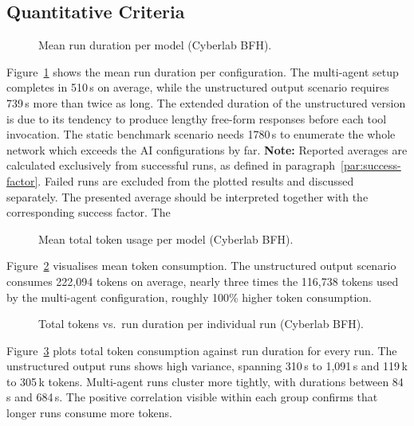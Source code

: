 \subsection{Quantitative Criteria}\label{subsec:quantitative-criteria-cyberlab}

\begin{figure}[H]
    \centering
    
    \caption{Mean run duration per model (Cyberlab BFH).}
    \label{fig:benchmark_duration_cyberlab}
\end{figure}

Figure~\ref{fig:benchmark_duration_cyberlab} shows the mean run duration per configuration.
The multi-agent setup completes in 510\,s on average, while the unstructured output scenario
requires 739\,s \textthreequartersemdash more than twice as long.
The extended duration of the unstructured version is due to its tendency to produce lengthy
free-form responses before each tool invocation.
The static benchmark scenario needs 1780\,s to enumerate the whole network which exceeds the \gls{AI} configurations by far.
\textbf{Note:} Reported averages are calculated exclusively from successful runs, as defined in paragraph~\ref{par:success-factor}.
Failed runs are excluded from the plotted results and discussed separately.
The presented average should be interpreted together with the corresponding success factor.
The


\begin{figure}[H]
    \centering
    
    \caption{Mean total token usage per model (Cyberlab BFH).}
    \label{fig:benchmark_tokens_cyberlab}
\end{figure}

Figure~\ref{fig:benchmark_tokens_cyberlab} visualises mean token consumption.
The unstructured output scenario consumes 222,094 tokens on average, nearly three times the
116,738 tokens used by the multi-agent configuration, roughly 100\% higher token consumption.

\begin{figure}[H]
    \centering
    
    \caption{Total tokens vs.\ run duration per individual run (Cyberlab BFH).}
    \label{fig:benchmark_scatter_cyberlab}
\end{figure}

Figure~\ref{fig:benchmark_scatter_cyberlab} plots total token consumption against run duration
for every run.
The unstructured output runs shows high variance, spanning 310\,s to
1{,}091\,s and 119\,k to 305\,k tokens.
Multi-agent runs cluster more tightly, with durations between 84\,s and 684\,s.
The positive correlation visible within each group confirms that longer runs consume more
tokens.

